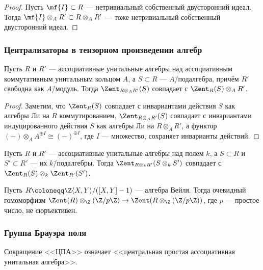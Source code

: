 \documentclass[
	extrafontsizes,
	11pt,
	hyphens,
]{memoir}
\begin{document}
\begin{proof}
Пусть \(\mf{I} \subset R\) --- нетривиальный собственный двусторонний идеал. Тогда \(\mf{I} \otimes_A R' \subset R \otimes_A R'\) --- тоже нетривиальный собственный двусторонний идеал.
\end{proof}

\subsubsection{Централизаторы в тензорном произведении алгебр}

\begin{theorem}
Пусть \(R\) и \(R'\) --- ассоциативные унитальные алгебры над ассоциативным коммутативным унитальным кольцом \(A\), а \(S \subset R\) --- \(A\)\=/подалгебра, причём \(R'\) свободна как \(A\)\=/модуль.
Тогда \(\Zent_{R \otimes_A R'}(S)\) совпадает с \(\Zent_R(S) \otimes_A R'\).
\end{theorem}

\begin{proof}
Заметим, что \(\Zent_R(S)\) совпадает с инвариантами действия \(S\) как алгебры Ли на \(R\) коммутированием, \(\Zent_{R \otimes_A R'}(S)\) совпадает с инвариантами индуцированного действия \(S\) как алгебры Ли на \(R \otimes_A R'\),
а функтор \((-) \otimes_A A^{\oplus I} \cong (-)^{\oplus I}\), где \(I\) --- множество, сохраняет инварианты действий.
\end{proof}

\begin{corollary}
Пусть \(R\) и \(R'\) --- ассоциативные унитальные алгебры над полем \(k\),
а \(S \subset R\) и \(S' \subset R'\) --- их \(k\)\=/подалгебры.
Тогда \(\Zent_{R \otimes_k R'}(S \otimes_k S')\) совпадает с \(\Zent_R(S) \otimes_k \Zent_{R'}(S')\).
\end{corollary}

\begin{example}
Пусть \(R \coloneqq \Z\langle X, Y \rangle / ([X,Y]-1)\) --- алгебра Вейля. Тогда очевидный гомоморфизм \(\Zent(R) \otimes_{\Z} (\Z/p\Z) \to \Zent(R \otimes_{\Z} (\Z/p\Z))\), где \(p\) --- простое число, не сюръективен.
\end{example}

\subsubsection{Группа Брауэра поля}

\begin{notation}
Сокращение <<ЦПА>> означает <<центральная простая ассоциативная унитальная алгебра>>.
\end{notation}
\end{document}
